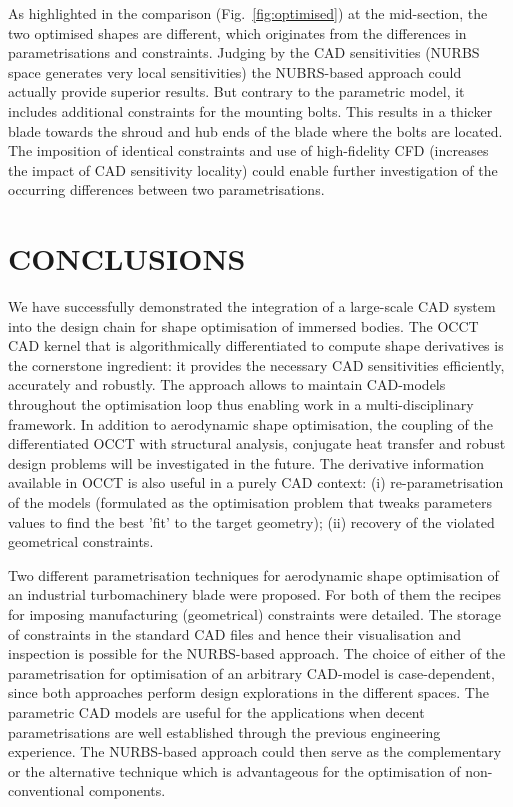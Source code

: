 \documentclass[9pt,academicons]{article}
\begin{document}
As highlighted in the comparison (Fig.~\ref{fig:optimised}) at the mid-section, the two optimised shapes are different, which originates from the differences in parametrisations and constraints. Judging by the CAD sensitivities (NURBS space generates very local sensitivities) the NUBRS-based approach could actually provide superior results. But contrary to the parametric model, it includes additional constraints for the mounting bolts. This results in a thicker blade towards the shroud and hub ends of the blade where the bolts are located. The imposition of identical constraints and use of high-fidelity CFD (increases the impact of CAD sensitivity locality) could enable further investigation of the occurring differences between two parametrisations.



\section{CONCLUSIONS}

We have successfully demonstrated the integration of a large-scale CAD system into the design chain 
for shape optimisation of immersed bodies. The OCCT CAD kernel that is algorithmically differentiated to compute shape derivatives is the cornerstone ingredient: it provides the  necessary CAD sensitivities efficiently, accurately and robustly. The approach allows to maintain CAD-models throughout the optimisation loop thus enabling work in a multi-disciplinary framework. In addition to aerodynamic shape optimisation, the coupling of the differentiated OCCT with structural analysis, conjugate heat transfer and robust design problems will be investigated in the future. The derivative information available in OCCT is also useful in a purely CAD context: (i) re-parametrisation of the models (formulated as the optimisation problem that tweaks parameters values to find the best 'fit' to the target geometry); (ii) recovery of the violated geometrical constraints.


Two different parametrisation techniques for aerodynamic shape optimisation of an industrial turbomachinery blade were proposed. For both of them the recipes for imposing manufacturing (geometrical) constraints were detailed. The storage of constraints in the standard CAD files and hence their visualisation and inspection is possible for the NURBS-based approach. The choice of either of the parametrisation for optimisation of an arbitrary CAD-model is case-dependent, since both approaches perform design explorations in the different spaces. The parametric CAD models are useful for the applications when decent parametrisations are well established through the previous engineering experience. The NURBS-based approach could then serve as the complementary or the alternative technique which is advantageous for the optimisation of non-conventional components.
\end{document}
